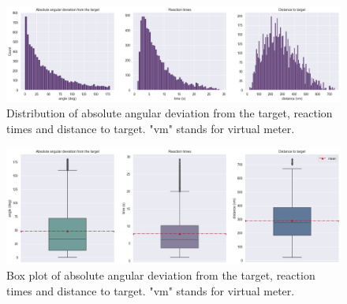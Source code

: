 \begin{figure}[!htb]
	\centering
	\includegraphics[width=160mm]{figures/ard_hist.png}
	\caption[Distribution of absolute angular deviation from the target, reaction times and distance to target]{Distribution of absolute angular deviation from the target, reaction times and distance to target. "vm" stands for virtual meter.}
	\label{fig:ard_hist}
\end{figure}

\begin{figure}[!htb]
	\centering
	\includegraphics[width=160mm]{figures/ard_box.png}
	\caption[Box plot of absolute angular deviation from the target, reaction times and distance to target]{Box plot of absolute angular deviation from the target, reaction times and distance to target. "vm" stands for virtual meter.}
	\label{fig:ard_box}
\end{figure}


